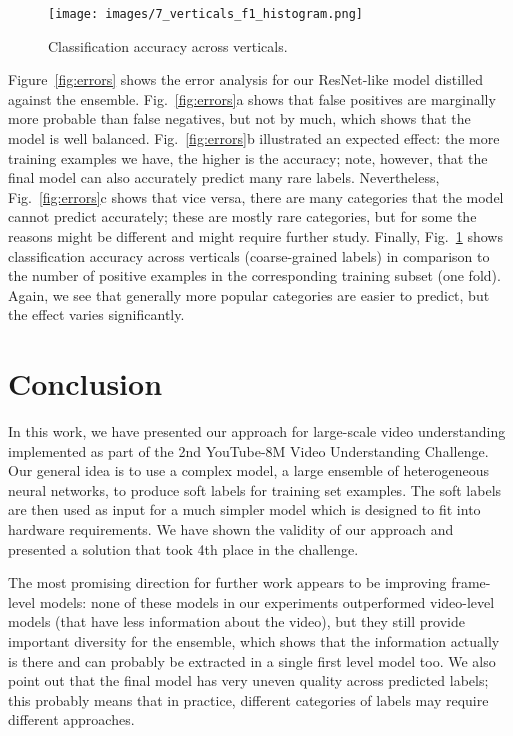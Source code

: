 \documentclass[runningheads]{llncs}
\begin{document}
\begin{figure}[t]\centering
\texttt{[image: images/7\_verticals\_f1\_histogram.png]}

\caption{Classification accuracy across verticals.}\label{fig:acc}
\end{figure}

Figure~\ref{fig:errors} shows the error analysis for our ResNet-like model distilled against the ensemble. Fig.~\ref{fig:errors}a shows that false positives are marginally more probable than false negatives, but not by much, which shows that the model is well balanced. Fig.~\ref{fig:errors}b illustrated an expected effect: the more training examples we have, the higher is the accuracy; note, however, that the final model can also accurately predict many rare labels. Nevertheless, Fig.~\ref{fig:errors}c shows that vice versa, there are many categories that the model cannot predict accurately; these are mostly rare categories, but for some the reasons might be different and might require further study. Finally, Fig.~\ref{fig:acc} shows classification accuracy across verticals (coarse-grained labels) in comparison to the number of positive examples in the corresponding training subset (one fold). Again, we see that generally more popular categories are easier to predict, but the effect varies significantly.


\section{Conclusion}\label{sec:concl}

In this work, we have presented our approach for large-scale video understanding implemented as part of the 2nd YouTube-8M Video Understanding Challenge. Our general idea is to use a complex model, a large ensemble of heterogeneous neural networks, to produce soft labels for training set examples. The soft labels are then used as input for a much simpler model which is designed to fit into hardware requirements. We have shown the validity of our approach and presented a solution that took 4th place in the challenge.

The most promising direction for further work appears to be improving frame-level models: none of these models in our experiments outperformed video-level models (that have less information about the video), but they still provide important diversity for the ensemble, which shows that the information actually is there and can probably be extracted in a single first level model too. We also point out that the final model has very uneven quality across predicted labels; this probably means that in practice, different categories of labels may require different approaches.



\end{document}
